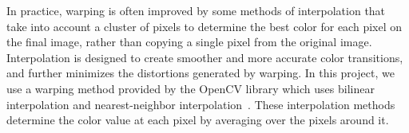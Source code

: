\documentclass[11pt, oneside, reqno]{book}
\begin{document}

In practice, warping is often improved by some methods of interpolation that take into account a cluster of pixels to determine the best color for each pixel on the final image, rather than copying a single pixel from the original image. Interpolation is designed to create smoother and more accurate color transitions, and further minimizes the distortions generated by warping. In this project, we use a warping method provided by the OpenCV library which uses bilinear interpolation and nearest-neighbor interpolation~\cite{opencvfeaturedetection}. 
These interpolation methods determine the color value at each pixel by averaging over the pixels around it.






%
%

\end{document}
